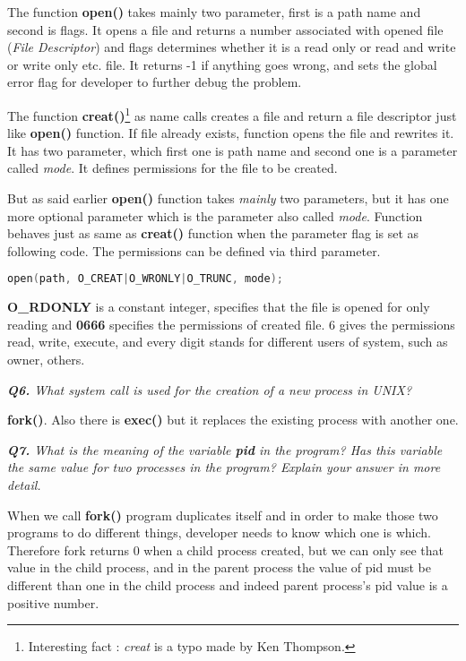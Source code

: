 \documentclass[11pt]{article}
\begin{document}
The function \textbf{open()} takes mainly two parameter, first is a path name and second is flags. It opens a file and returns a number associated with opened file (\textit{File Descriptor}) and flags determines whether it is a read only or read and write or write only etc. file. It returns -1 if anything goes wrong, and sets the global error flag for developer to further debug the problem. 

The function \textbf{creat()}\footnote{Interesting fact : \textit{creat} is a typo made by Ken Thompson.} as name calls creates a file and return a file descriptor just like \textbf{open()} function. If file already exists, function opens the file and rewrites it.  It has two parameter, which first one is path name and second one is a parameter called \textit{mode}. It defines permissions for the file to be created.

But as said earlier \textbf{open()}  function takes \textit{mainly} two parameters, but it has one more optional parameter which is the parameter also called \textit{mode}. Function behaves just as same as \textbf{creat()} function when the parameter flag is set as following code. The permissions can be defined via third parameter.

\begin{lstlisting}[language=C]
open(path, O_CREAT|O_WRONLY|O_TRUNC, mode);
\end{lstlisting}

\textbf{O\_RDONLY} is a constant integer, specifies that the file is opened for only reading and \textbf{0666} specifies the permissions of created file. 6 gives the permissions read, write, execute, and every digit stands for different users of system, such as owner, others.

\vspace{5mm}
\textit{\textbf{Q6.} What system call is used for the creation of a new process in UNIX?}
\vspace{5mm}

\textbf{fork()}. Also there is \textbf{exec()} but it replaces the existing process with another one.

\vspace{5mm}
\textit{\textbf{Q7.} What is the meaning of the variable \textbf{pid} in the program? Has this variable the same value for two processes in the program? Explain your answer in more detail.}
\vspace{5mm}

When we call \textbf{fork()} program duplicates itself and in order to make those two programs to do different things, developer needs to know which one is which. Therefore fork returns 0 when a child process created, but we can only see that value in the child process, and in the parent process the value of pid must be different than one in the child process and indeed parent process's pid value is a positive number.
\end{document}
